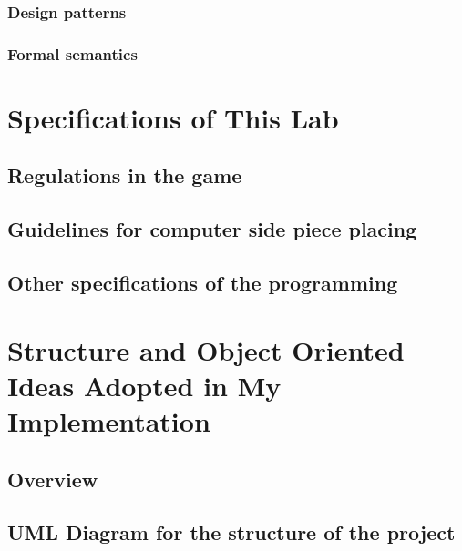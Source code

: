 \documentclass[a4paper]{report}
\begin{document}
\subsection{Design patterns}

\subsection{Formal semantics}




\chapter{Specifications of This Lab}
\section{Regulations in the game}



\section{Guidelines for computer side piece placing}




\section{Other specifications of the programming}












\chapter{Structure and Object Oriented Ideas Adopted in My Implementation}
\section{Overview}



\section{UML Diagram for the structure of the project}
\end{document}
